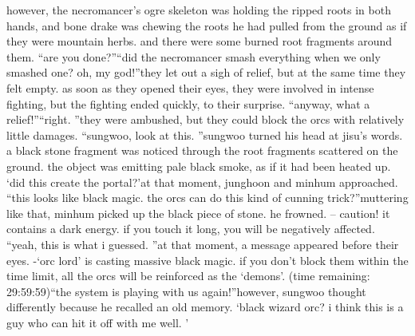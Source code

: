 however, the necromancer’s ogre skeleton was holding the ripped roots in both hands, and bone drake was chewing the roots he had pulled from the ground as if they were mountain herbs.
 and there were some burned root fragments around them.
“are you done?”“did the necromancer smash everything when we only smashed one? oh, my god!”they let out a sigh of relief, but at the same time they felt empty.
 as soon as they opened their eyes, they were involved in intense fighting, but the fighting ended quickly, to their surprise.
“anyway, what a relief!”“right.
”they were ambushed, but they could block the orcs with relatively little damages.
“sungwoo, look at this.
”sungwoo turned his head at jisu’s words.
 a black stone fragment was noticed through the root fragments scattered on the ground.
 the object was emitting pale black smoke, as if it had been heated up.
‘did this create the portal?’at that moment, junghoon and minhum approached.
“this looks like black magic.
 the orcs can do this kind of cunning trick?”muttering like that, minhum picked up the black piece of stone.
 he frowned.
– caution! it contains a dark energy.
 if you touch it long, you will be negatively affected.
“yeah, this is what i guessed.
”at that moment, a message appeared before their eyes.
-‘orc lord’ is casting massive black magic.
 if you don’t block them within the time limit, all the orcs will be reinforced as the ‘demons’.
 (time remaining: 29:59:59)“the system is playing with us again!”however, sungwoo thought differently because he recalled an old memory.
‘black wizard orc? i think this is a guy who can hit it off with me well.
’

 